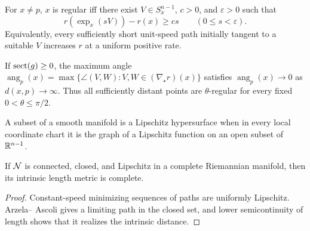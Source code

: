 \begin{lemma}
\label{lem:chow-iii-i34-i35-regular-characterization}

For $x\ne p$, $x$ is regular iff there exist $V\in S_x^{n-1}$, $c>0$, and
$\varepsilon>0$ such that
\[
r(\exp_x(sV))-r(x)\ge cs\qquad(0\le s<\varepsilon).
\]
Equivalently, every sufficiently short unit-speed path initially tangent to a
suitable $V$ increases $r$ at a uniform positive rate.
\end{lemma}

\begin{lemma}
\label{lem:chow-iii-i37-angle-decay}

If $\operatorname{sect}(g)\ge0$, the maximum angle
$\operatorname{ang}_p(x)=\max\{\angle(V,W):V,W\in(\nabla_\star r)(x)\}$
satisfies $\operatorname{ang}_p(x)\to0$ as $d(x,p)\to\infty$.  Thus all
sufficiently distant points are $\theta$-regular for every fixed
$0<\theta\le\pi/2$.
\end{lemma}

\begin{definition}
\label{def:chow-iii-i39-lipschitz-hypersurface}
A subset of a smooth manifold is a Lipschitz hypersurface when in every local
coordinate chart it is the graph of a Lipschitz function on an open subset of
$\mathbb R^{n-1}$.
\end{definition}

\begin{lemma}
\label{lem:chow-iii-i40-lipschitz-complete}

If $\mathcal N$ is connected, closed, and Lipschitz in a complete Riemannian
manifold, then its intrinsic length metric is complete.
\end{lemma}
\begin{proof}
\sketch
Constant-speed minimizing sequences of paths are uniformly Lipschitz.  Arzela--
Ascoli gives a limiting path in the closed set, and lower semicontinuity of
length shows that it realizes the intrinsic distance.
\end{proof}

